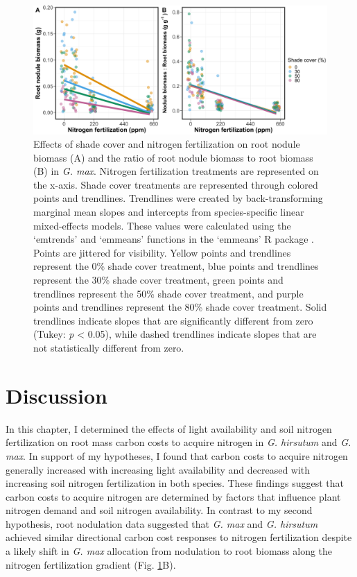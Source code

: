 \newpage
\begin{figure}
    \centering
    \includegraphics[width=\textwidth]{ch2_LxN_Greenhouse/figs/fig4_nodwgt.png}
    \caption[Effects of shade cover and nitrogen fertilization on root nodule biomass and the ratio of root nodule biomass to root biomass in \textit{G. max}.]{Effects of shade cover and nitrogen fertilization on root nodule biomass (A) and the ratio of root nodule biomass to root biomass (B) in \textit{G. max}. Nitrogen fertilization treatments are represented on the x-axis. Shade cover treatments are represented through colored points and trendlines. Trendlines were created by back-transforming marginal mean slopes and intercepts from species-specific linear mixed-effects models. These values were calculated using the ‘emtrends’ and ‘emmeans’ functions in the ‘emmeans’ R package . Points are jittered for visibility. Yellow points and trendlines represent the 0\% shade cover treatment, blue points and trendlines represent the 30\% shade cover treatment, green points and trendlines represent the 50\% shade cover treatment, and purple points and trendlines represent the 80\% shade cover treatment. Solid trendlines indicate slopes that are significantly different from zero (Tukey: \textit{p} < 0.05), while dashed trendlines indicate slopes that are not statistically different from zero.}
    \label{fig:figure2.4}
\end{figure}
\clearpage

\section{Discussion}
In this chapter, I determined the effects of light availability and soil nitrogen fertilization on root mass carbon costs to acquire nitrogen in \textit{G. hirsutum} and \textit{G. max}. In support of my hypotheses, I found that carbon costs to acquire nitrogen generally increased with increasing light availability and decreased with increasing soil nitrogen fertilization in both species. These findings suggest that carbon costs to acquire nitrogen are determined by factors that influence plant nitrogen demand and soil nitrogen availability. In contrast to my second hypothesis, root nodulation data suggested that \textit{G. max} and \textit{G. hirsutum} achieved similar directional carbon cost responses to nitrogen fertilization despite a likely shift in \textit{G. max} allocation from nodulation to root biomass along the nitrogen fertilization gradient (Fig. \ref{fig:figure2.4}B).

